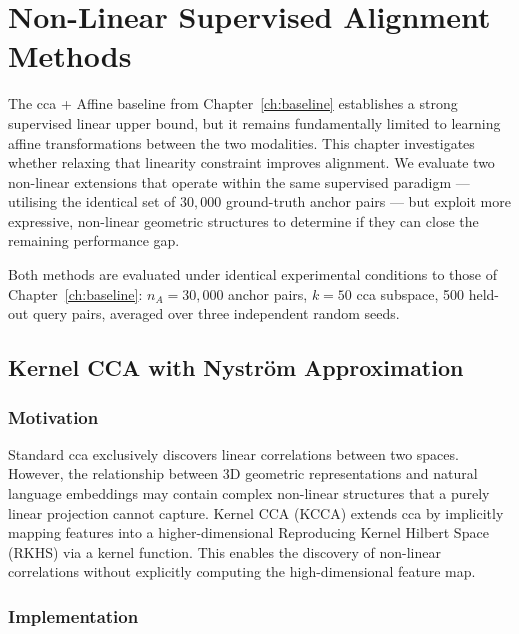 \chapter{Non-Linear Supervised Alignment Methods}
\label{ch:nonlinear}

The \gls{cca} + Affine baseline from Chapter~\ref{ch:baseline} establishes a strong supervised linear upper bound, but it remains fundamentally limited to learning affine transformations between the two modalities. This chapter investigates whether relaxing that linearity constraint improves alignment. We evaluate two non-linear extensions that operate within the same supervised paradigm --- utilising the identical set of $30{,}000$ ground-truth anchor pairs --- but exploit more expressive, non-linear geometric structures to determine if they can close the remaining performance gap.

Both methods are evaluated under identical experimental conditions to those of Chapter~\ref{ch:baseline}: $n_A = 30{,}000$ anchor pairs, $k = 50$ \gls{cca} subspace, 500 held-out query pairs, averaged over three independent random seeds.

\section{Kernel CCA with Nyström Approximation}
\label{sec:kcca}

\subsection{Motivation}
\label{subsec:kcca_motivation}

Standard \gls{cca} exclusively discovers linear correlations between two spaces. However, the relationship between 3D geometric representations and natural language embeddings may contain complex non-linear structures that a purely linear projection cannot capture. Kernel CCA (KCCA) extends \gls{cca} by implicitly mapping features into a higher-dimensional Reproducing Kernel Hilbert Space (RKHS) via a kernel function. This enables the discovery of non-linear correlations without explicitly computing the high-dimensional feature map.

\subsection{Implementation}
\label{subsec:kcca_implementation}

